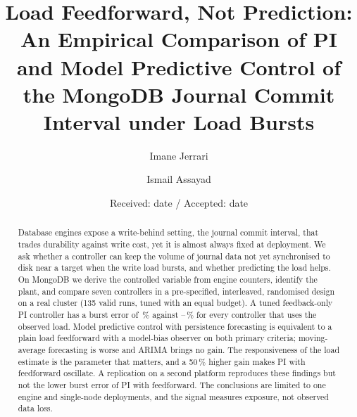 \documentclass[smallextended]{svjour3}
\begin{document}
\title{Load Feedforward, Not Prediction: An Empirical Comparison of PI and
Model Predictive Control of the MongoDB Journal Commit Interval under Load Bursts}

\author{Imane Jerrari \and Ismail Assayad}


\date{Received: date / Accepted: date}
\maketitle

\begin{abstract}
Database engines expose a write-behind setting, the journal commit interval, that trades durability against write cost, yet it is almost always fixed at
deployment. We ask whether a controller can keep the volume of journal data not yet synchronised to disk near a target when the write load bursts,
and whether predicting the load helps. On MongoDB we derive the controlled variable from engine counters, identify the plant, and compare seven controllers
in a pre-specified, interleaved, randomised design on a real cluster (135 valid runs, tuned with an equal budget). A tuned feedback-only PI controller has a
burst error of \MaePITS\,\% against \MaePIFFS--\MaeMPCMS\,\% for every controller that uses the observed load. Model predictive control with persistence
forecasting is equivalent to a plain load feedforward with a model-bias observer on both primary criteria; moving-average forecasting is worse and ARIMA brings no gain.
The responsiveness of the load estimate is the parameter that matters, and a 50\,\% higher gain makes PI with feedforward oscillate. A replication on a second platform
reproduces these findings but not the lower burst error of PI with feedforward. The conclusions are limited to one engine and single-node deployments, and the signal
measures exposure, not observed data loss.
\end{abstract}
\end{document}
